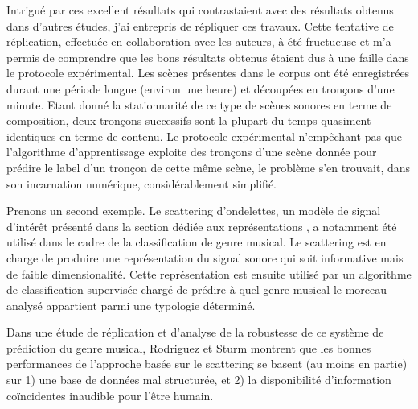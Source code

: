   Intrigué par ces excellent résultats qui contrastaient avec des résultats obtenus dans d'autres études, j'ai entrepris de répliquer ces travaux. Cette tentative de réplication, effectuée en collaboration avec les auteurs, à été fructueuse et m'a permis de comprendre que les bons résultats obtenus étaient dus à une faille dans le protocole expérimental\cite{lagrange2015}. Les scènes présentes dans le corpus ont été enregistrées durant une période longue (environ une heure) et découpées en tronçons d'une minute. Etant donné la stationnarité de ce type de scènes sonores en terme de composition, deux tronçons successifs sont la plupart du temps quasiment identiques en terme de contenu. Le protocole expérimental n'empêchant pas que l'algorithme d'apprentissage exploite des tronçons d'une scène donnée pour prédire le label d'un tronçon de cette même scène, le problème s'en trouvait, dans son incarnation numérique, considérablement simplifié. 

  Prenons un second exemple. Le scattering d'ondelettes, un modèle de signal d'intérêt présenté dans la section dédiée aux représentations , a notamment été utilisé dans le cadre de la classification de genre musical\cite{anden2014deep}. Le scattering est en charge de produire une représentation du signal sonore qui soit informative mais de faible dimensionalité. Cette représentation est ensuite utilisé par un algorithme de classification supervisée chargé de prédire à quel genre musical le morceau analysé appartient parmi une typologie déterminé.

  Dans une étude de réplication et d'analyse de la robustesse de ce système de prédiction du genre musical\cite{rodriguez2016analysing}, Rodriguez et Sturm montrent que les bonnes performances de l'approche basée sur le scattering se basent (au moins en partie) sur 1) une base de données mal structurée, et 2) la disponibilité d'information coïncidentes inaudible pour l'être humain.

